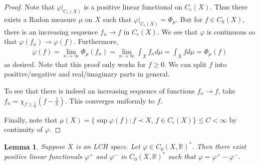 \documentclass[11pt]{amsart}
\newtheorem{lemma}[theorem]{Lemma}
\theoremstyle{definition}
\numberwithin{equation}{section}
\begin{document}
\begin{proof}
    Note that $\varphi|_{C_c(X)}$ is a positive linear functional on $C_c(X)$. Thus there exists a Radon measure $\mu$ on $X$ such that $\varphi|_{C_c(X)}=\Phi_\mu$. But for $f\in C_0(X)$, there is an increasing sequence $f_n\to f$ in $C_c(X)$. We see that $\varphi$ is continuous so that $\varphi(f_n)\to\varphi(f)$. Furthermore, 
    \begin{align*}
        \varphi(f)=\lim_{n\to\infty}\Phi_\mu(f_n)=\lim_{n\to\infty}\int_Xf_nd\mu=\int_Xfd\mu=\Phi_\mu(f)
    \end{align*}
    as desired. Note that this proof only works for $f\ge 0$. We can split $f$ into positive/negative and real/imaginary parts in general.

    To see that there is indeed an increasing sequence of functions $f_n\to f$, take $f_n=\chi_{f\ge\frac{1}{n}}(f-\frac{1}{n})$. This converges uniformly to $f$. 

    Finally, note that $\mu(X)=\{\sup\varphi(f):f\prec X,\,f\in C_c(X)\}\le C<\infty$ by continuity of $\varphi$.
\end{proof}
\begin{lemma}
    Suppose $X$ is an LCH space. Let $\varphi\in C_0(X,\mathbb R)^*$. Then there exist positive linear functionals $\varphi^+$ and $\varphi^-$ in $C_0(X,\mathbb R)^*$ such that $\varphi=\varphi^+-\varphi^-$.
\end{lemma}
\end{document}
